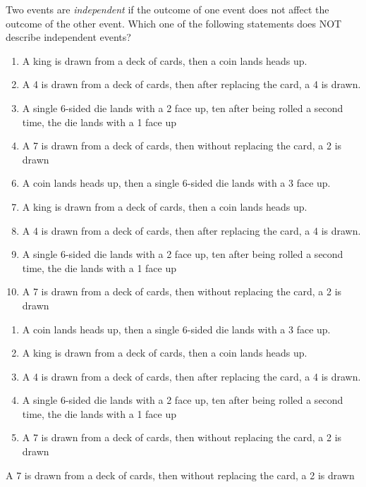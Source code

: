 Two events are \textit{independent} if the outcome of one event does not affect the outcome of the other event. Which one of the following statements does NOT describe independent events?

\ifsat
	\begin{enumerate}[label=\Alph*)]
		\item  A king is drawn from a deck of cards, then a coin lands heads up.
		\item  A 4 is drawn from a deck of cards, then after replacing the card, a 4 is drawn.
		\item  A single 6-sided die lands with a 2 face up, ten after being rolled a second time, the die lands with a 1 face up 
		\item  A 7 is drawn from a deck of cards, then without replacing the card, a 2 is drawn %
	\end{enumerate}
\else
\fi

\ifacteven
	\begin{enumerate}[label=\textbf{\Alph*.},itemsep=\fill,align=left]
		\setcounter{enumii}{5}
		\item   A coin lands heads up, then a single 6-sided die lands with a 3 face up.
		\item  A king is drawn from a deck of cards, then a coin lands heads up.
		\item  A 4 is drawn from a deck of cards, then after replacing the card, a 4 is drawn.
		\addtocounter{enumii}{1}
		\item  A single 6-sided die lands with a 2 face up, ten after being rolled a second time, the die lands with a 1 face up 
		\item  A 7 is drawn from a deck of cards, then without replacing the card, a 2 is drawn %
	\end{enumerate}
\else
\fi

\ifactodd
	\begin{enumerate}[label=\textbf{\Alph*.},itemsep=\fill,align=left]
		\item   A coin lands heads up, then a single 6-sided die lands with a 3 face up.
		\item  A king is drawn from a deck of cards, then a coin lands heads up.
		\item  A 4 is drawn from a deck of cards, then after replacing the card, a 4 is drawn.
		\item  A single 6-sided die lands with a 2 face up, ten after being rolled a second time, the die lands with a 1 face up 
		\item  A 7 is drawn from a deck of cards, then without replacing the card, a 2 is drawn %
	\end{enumerate}
\else
\fi

\ifgridin
  A 7 is drawn from a deck of cards, then without replacing the card, a 2 is drawn %

\else
\fi

